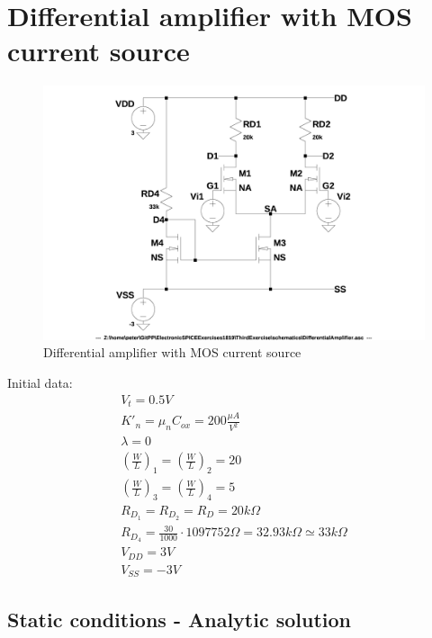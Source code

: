 \chapter{Differential amplifier with MOS current source}\label{diffampchapter}

\begin{figure}[h]
  \centering
  \includegraphics[width=12cm]{schematics/DifferentialAmplifier/Circuit.jpg}
  \caption{Differential amplifier with MOS current source}
  \label{DifferentialAmplifier}
\end{figure}

Initial data:\\
\begin{align}
V_t = 0.5V\\
{K'}_n = {\mu}_n C_{ox} = 200 \frac{\mu A}{V^2}\\
\lambda = 0\\
\left(\frac{W}{L}\right)_1 = \left(\frac{W}{L}\right)_2 = 20\\
\left(\frac{W}{L}\right)_3 = \left(\frac{W}{L}\right)_4 = 5\\
R_{D_1} = R_{D_2} = R_D = 20k\Omega \label{RD}\\
R_{D_4} = \frac{30}{1000}\cdot 1097752 \Omega = 32.93k\Omega \simeq 33k\Omega\\
V_{DD} = 3V\\
V_{SS} = -3V
\end{align}

\section{Static conditions - Analytic solution}

